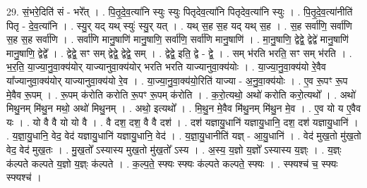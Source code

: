 \documentclass[17pt]{extarticle}
\begin{document}
29. सं॒भरे॒दिति॑ सं - भरे᳚त् । . पि॒तृ॒दे॒व॒त्या॑नि स्युः स्युः पितृदेव॒त्या॑नि पितृदेव॒त्या॑नि स्युः । . पि॒तृ॒दे॒व॒त्या॑नीति॑ पितृ - दे॒व॒त्या॑नि । . स्यु॒र् यद् यथ् स्युः॑ स्यु॒र् यत् । . यथ् स॒ह स॒ह यद् यथ् स॒ह । . स॒ह सर्वा॑णि॒ सर्वा॑णि स॒ह स॒ह सर्वा॑णि । . सर्वा॑णि मानु॒षाणि॑ मानु॒षाणि॒ सर्वा॑णि॒ सर्वा॑णि मानु॒षाणि॑ । . मा॒नु॒षाणि॒ द्वेद्वे॒ द्वेद्वे॑ मानु॒षाणि॑ मानु॒षाणि॒ द्वेद्वे᳚ । . द्वेद्वे॒ सꣳ सम् द्वेद्वे॒ द्वेद्वे॒ सम् । . द्वेद्वे॒ इति॒ द्वे - द्वे॒ । . सम् भ॑रति भरति॒ सꣳ सम् भ॑रति । . भ॒र॒ति॒ या॒ज्या॒नु॒वा॒क्य॑योर् याज्यानुवा॒क्य॑योर् भरति भरति याज्यानुवा॒क्य॑योः । . या॒ज्या॒नु॒वा॒क्य॑यो रे॒वैव या᳚ज्यानुवा॒क्य॑योर् याज्यानुवा॒क्य॑यो रे॒व । . या॒ज्या॒नु॒वा॒क्य॑यो॒रिति॑ याज्या - अ॒नु॒वा॒क्य॑योः । . ए॒व रू॒पꣳ रू॒प मे॒वैव रू॒पम् । . रू॒पम् क॑रोति करोति रू॒पꣳ रू॒पम् क॑रोति । . क॒रो॒त्यथो॒ अथो॑ करोति करो॒त्यथो᳚ । . अथो॑ मिथु॒नम् मि॑थु॒न मथो॒ अथो॑ मिथु॒नम् । . अथो॒ इत्यथो᳚ । . मि॒थु॒न मे॒वैव मि॑थु॒नम् मि॑थु॒न मे॒व । . ए॒व यो य ए॒वैव यः । . यो वै वै यो यो वै । . वै दश॒ दश॒ वै वै दश॑ । . दश॑ यज्ञायु॒धानि॑ यज्ञायु॒धानि॒ दश॒ दश॑ यज्ञायु॒धानि॑ । . य॒ज्ञा॒यु॒धानि॒ वेद॒ वेद॑ यज्ञायु॒धानि॑ यज्ञायु॒धानि॒ वेद॑ । . य॒ज्ञा॒यु॒धानीति॑ यज्ञ् - आ॒यु॒धानि॑ । . वेद॑ मुख॒तो मु॑ख॒तो वेद॒ वेद॑ मुख॒तः । . मु॒ख॒तो᳚ ऽस्यास्य मुख॒तो मु॑ख॒तो᳚ ऽस्य । . अ॒स्य॒ य॒ज्ञो य॒ज्ञो᳚ ऽस्यास्य य॒ज्ञ्ः । . य॒ज्ञ्ः क॑ल्पते कल्पते य॒ज्ञो य॒ज्ञ्ः क॑ल्पते । . क॒ल्प॒ते॒ स्फ्यः स्फ्यः क॑ल्पते कल्पते॒ स्फ्यः । . स्फ्यश्च॑ च॒ स्फ्यः स्फ्यश्च॑ । \newline
\end{document}
